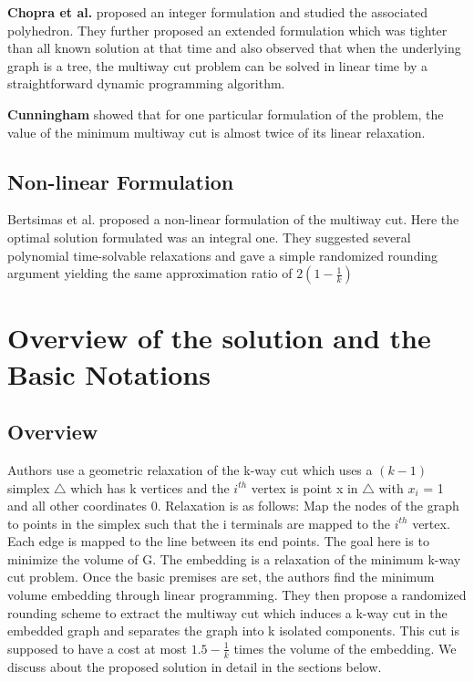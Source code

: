 \documentclass[11pt]{article}
\begin{document}
\textbf{Chopra et al.} proposed an integer formulation and studied the associated polyhedron. They further proposed an extended formulation  which was tighter than all known solution at that time and also observed that when the underlying graph is a tree, the multiway cut problem can be solved in linear time by a straightforward dynamic programming algorithm.

\textbf{Cunningham} showed that for one particular formulation of the problem, the value of the minimum multiway cut is almost twice of its linear relaxation.

\subsection{Non-linear Formulation}
Bertsimas et al.\cite{Bertsimas} proposed a non-linear formulation of the multiway cut. Here the optimal solution formulated was an integral one. They suggested several polynomial time-solvable relaxations and gave a simple randomized rounding argument yielding the same approximation ratio of $2(1 - \frac{1}{k})$

\section{Overview of the solution and the Basic Notations}
\subsection{Overview}
 Authors use a geometric relaxation of the k-way cut which uses a $(k-1)$ simplex $\bigtriangleup$ which has k vertices and the $i^{th}$ vertex is point x in $\bigtriangleup$ with $x_i$ = 1 and all other coordinates 0. Relaxation is as follows: Map the nodes of the graph to points in the simplex such that the i terminals are mapped to the $i^{th}$ vertex. Each edge is mapped to the line between its end points. The goal here is to minimize the volume of G. The embedding is a relaxation of the minimum k-way cut problem. Once the basic premises are set, the authors find the minimum volume embedding through linear programming. They then propose a randomized rounding scheme to extract the multiway cut which induces a k-way cut in the embedded graph and separates the graph into k isolated components. This cut is supposed to have a cost at most $1.5 - \frac{1}{k}$ times the volume of the embedding. We discuss about the proposed solution in detail in the sections below. 
\end{document}
